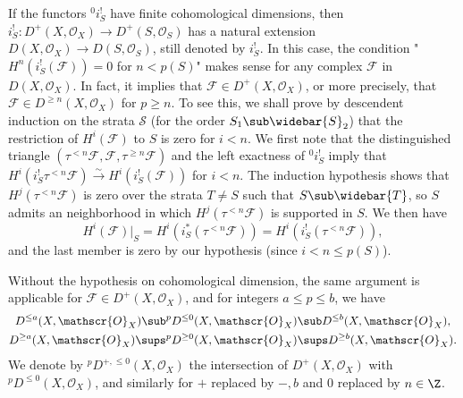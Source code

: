 \begin{remark}\label{triangle cat perverse condition finite cohomology dim}
If the functors ${^0i_S^!}$ have finite cohomological dimensions, then $i_S^!:D^+(X,\mathscr{O}_X)\to D^+(S,\mathscr{O}_S)$ has a natural extension $D(X,\mathscr{O}_X)\to D(S,\mathscr{O}_S)$, still denoted by $i_S^!$. In this case, the condition "$H^n(i_S^!(\mathscr{F}))=0$ for $n<p(S)$" makes sense for any complex $\mathscr{F}$ in $D(X,\mathscr{O}_X)$. In fact, it implies that $\mathscr{F}\in D^+(X,\mathscr{O}_X)$, or more precisely, that $\mathscr{F}\in D^{\geq n}(X,\mathscr{O}_X)$ for $p\geq n$. To see this, we shall prove by descendent induction on the strata $\mathcal{S}$ (for the order $S_1\sub\widebar{S}_2$) that the restriction of $H^i(\mathscr{F})$ to $S$ is zero for $i<n$. We first note that the distinguished triangle $(\tau^{<n}\mathscr{F},\mathscr{F},\tau^{\geq n}\mathscr{F})$ and the left exactness of ${^0i_S^!}$ imply that $H^i(i_S^!\tau^{<n}\mathscr{F})\stackrel{\sim}{\to} H^i(i_S^!(\mathscr{F}))$ for $i<n$. The induction hypothesis shows that $H^j(\tau^{<n}\mathscr{F})$ is zero over the strata $T\neq S$ such that $S\sub\widebar{T}$, so $S$ admits an neighborhood in which $H^j(\tau^{<n}\mathscr{F})$ is supported in $S$. We then have
\[H^i(\mathscr{F})|_S=H^i(i_S^*(\tau^{<n}\mathscr{F}))=H^i(i_S^!(\tau^{<n}\mathscr{F})),\]
and the last member is zero by our hypothesis (since $i<n\leq p(S)$).\par
Without the hypothesis on cohomological dimension, the same argument is applicable for $\mathscr{F}\in D^+(X,\mathscr{O}_X)$, and for integers $a\leq p\leq b$, we have
\begin{align}
D^{\leq a}(X,\mathscr{O}_X)\sub &{^pD^{\leq 0}}(X,\mathscr{O}_X)\sub D^{\leq b}(X,\mathscr{O}_X),\label{triangle cat perverse condition inclusion-1}\\
D^{\geq a}(X,\mathscr{O}_X)\sups &{^pD^{\geq 0}}(X,\mathscr{O}_X)\sups D^{\geq b}(X,\mathscr{O}_X).\label{triangle cat perverse condition inclusion-2}
\end{align}
We denote by ${^pD^{+,\leq 0}}(X,\mathscr{O}_X)$ the intersection of $D^+(X,\mathscr{O}_X)$ with ${^pD^{\leq 0}}(X,\mathscr{O}_X)$, and similarly for $+$ replaced by $-,b$ and $0$ replaced by $n\in\Z$.
\end{remark}

